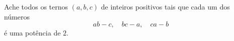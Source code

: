Ache todos os ternos $(a,b,c)$ de inteiros positivos tais que cada um dos números \[ab-c,\quad bc-a,\quad ca-b\] é uma potência de $2$.
